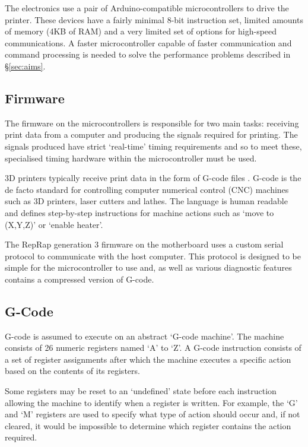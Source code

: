 			The electronics use a pair of Arduino-compatible microcontrollers to drive
			the printer. These devices have a fairly minimal 8-bit instruction set,
			limited amounts of memory (4KB of RAM) and a very limited set of options
			for high-speed communications. A faster microcontroller capable of faster
			communication and command processing is needed to solve the performance
			problems described in \S\ref{sec:aims}.
		
		\subsection{Firmware}
			
			The firmware on the microcontrollers is responsible for two main tasks:
			receiving print data from a computer and producing the signals required
			for printing. The signals produced have strict `real-time' timing
			requirements and so to meet these, specialised timing hardware within the
			microcontroller must be used.
			
			3D printers typically receive print data in the form of G-code files
			\cite{reprapgcode}. G-code is the de facto standard for controlling
			computer numerical control (CNC) machines such as 3D printers, laser
			cutters and lathes. The language is human readable and defines
			step-by-step instructions for machine actions such as `move to (X,Y,Z)' or
			`enable heater'.
			
			The RepRap generation 3 firmware on the motherboard uses a custom serial
			protocol to communicate with the host computer. This protocol is designed
			to be simple for the microcontroller to use and, as well as various
			diagnostic features contains a compressed version of G-code.
			
		\subsection{G-Code}
			
			\label{sec:gcodemachine}
			
			G-code is assumed to execute on an abstract `G-code machine'. The machine
			consists of 26 numeric registers named `A' to `Z'.  A G-code instruction
			consists of a set of register assignments after which the machine
			executes a specific action based on the contents of its registers.
			
			Some registers may be reset to an `undefined' state before each
			instruction allowing the machine to identify when a register is written.
			For example, the `G' and `M' registers are used to specify what type of
			action should occur and, if not cleared, it would be impossible
			to determine which register contains the action required.
			
